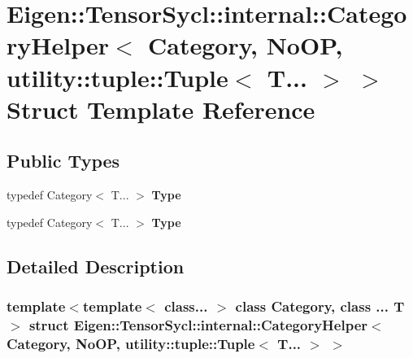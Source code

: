 \hypertarget{struct_eigen_1_1_tensor_sycl_1_1internal_1_1_category_helper_3_01_category_00_01_no_o_p_00_01utibb88c866c1595c08be9f6b8e0a368a00}{}\section{Eigen\+:\+:Tensor\+Sycl\+:\+:internal\+:\+:Category\+Helper$<$ Category, No\+OP, utility\+:\+:tuple\+:\+:Tuple$<$ T... $>$ $>$ Struct Template Reference}
\label{struct_eigen_1_1_tensor_sycl_1_1internal_1_1_category_helper_3_01_category_00_01_no_o_p_00_01utibb88c866c1595c08be9f6b8e0a368a00}
\subsection*{Public Types}
\begin{DoxyCompactItemize}
\item 
\mbox{\label{struct_eigen_1_1_tensor_sycl_1_1internal_1_1_category_helper_3_01_category_00_01_no_o_p_00_01utibb88c866c1595c08be9f6b8e0a368a00_a7fbb62f8d61633da54166fce6bf8aae6}} 
typedef Category$<$ T... $>$ {\bfseries Type}
\item 
\mbox{\label{struct_eigen_1_1_tensor_sycl_1_1internal_1_1_category_helper_3_01_category_00_01_no_o_p_00_01utibb88c866c1595c08be9f6b8e0a368a00_a7fbb62f8d61633da54166fce6bf8aae6}} 
typedef Category$<$ T... $>$ {\bfseries Type}
\end{DoxyCompactItemize}


\subsection{Detailed Description}
\subsubsection*{template$<$template$<$ class... $>$ class Category, class ... T$>$\newline
struct Eigen\+::\+Tensor\+Sycl\+::internal\+::\+Category\+Helper$<$ Category, No\+O\+P, utility\+::tuple\+::\+Tuple$<$ T... $>$ $>$}



